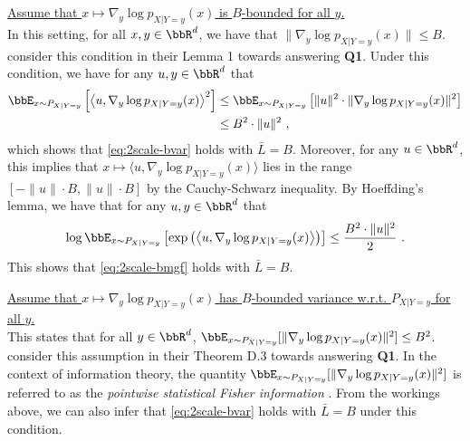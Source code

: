 \documentclass[11pt]{article}
\begin{document}
\begin{condlist}[leftmargin=*]
    \item \underline{Assume that \(x \mapsto \nabla_{y}\log p_{X | Y = y}(x)\) is \(B\)-bounded for all \(y\).}
    \\
    In this setting, for all \(x, y \in \bbR^{d}\), we have that \(\|\nabla_{y}\log p_{X | Y = y}(x)\| \leq B\).
    \citet{mou2019sampling} consider this condition in their Lemma 1 towards answering \textbf{Q1}.
    Under this condition, we have for any \(u, y \in \bbR^{d}\) that
    \begin{align*}
        \bbE_{x \sim P_{X | Y = y}}\left[\left\langle u, \nabla_{y}\log p_{X | Y = y}(x)\right\rangle^{2}\right] &\leq \bbE_{x \sim P_{X | Y = y}}\left[\|u\|^{2} \cdot \|\nabla_{y}\log p_{X | Y = y}(x)\|^{2}\right] \\
        &\le B^{2} \cdot \|u\|^{2}~,
    \end{align*}
    which shows that \ref{eq:2scale-bvar} holds with \(\bar{L} = B\).
    Moreover, for any \(u \in \bbR^{d}\), this implies that \(x \mapsto \langle u, \nabla_{y}\log p_{X | Y = y}(x)\rangle\) lies in the range \([-\|u\| \cdot B, \|u\| \cdot B]\) by the Cauchy-Schwarz inequality.
    By Hoeffding's lemma, we have that for any \(u, y \in \bbR^{d}\) that
    \begin{equation*}
        \log \bbE_{x \sim P_{X | Y = y}}\left[\exp\left(\left\langle u, \nabla_{y}\log p_{X | Y = y}(x)\right\rangle \right)\right] \leq \frac{B^{2} \cdot \|u\|^{2}}{2}~.
    \end{equation*}
    This shows that \ref{eq:2scale-bmgf} holds with \(\bar{L} = B\).


    \item \underline{Assume that \(x \mapsto \nabla_{y}\log p_{X | Y = y}(x)\) has \(B\)-bounded variance w.r.t. \(P_{X | Y = y}\) for all \(y\).}
    \\
    This states that for all \(y \in \bbR^{d}\), \(\bbE_{x \sim P_{X | Y = y}}[\|\nabla_{y}\log p_{X | Y = y}(x)\|^{2}] \leq B^{2}\).
    \citet{ge2020simulated} consider this assumption in their Theorem D.3 towards answering \textbf{Q1}.
    In the context of information theory, the quantity \(\bbE_{x \sim P_{X | Y = y}}[\|\nabla_{y}\log p_{X | Y =y}(x)\|^{2}]\) is referred to as the \emph{pointwise statistical Fisher information} \citep[\S III.B]{wibisono2017information}.
    From the workings above, we can also infer that \ref{eq:2scale-bvar} holds with \(\bar{L} = B\) under this condition.


\end{condlist}
\end{document}
